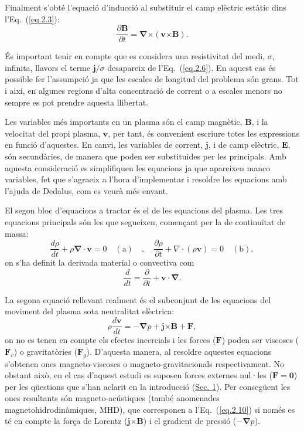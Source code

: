 Finalment s'obté l'equació d'inducció al substituir el camp elèctric estàtic %
dins l'Eq.~(\ref{eq.2.3}):
\begin{equation}
	\frac{\partial \bm{B}}{\partial t} = \bm{\nabla} \bm{\times} (\bm{v} \bm{\times} \bm{B}). \tag{2.7} \label{eq.2.7}
\end{equation}

És important tenir en compte que es considera una resistivitat del medi, $\sigma$, infinita, llavors el terme $\bm{j}/\sigma$ desapareix de l'Eq.~(\ref{eq.2.6}).
En aquest cas és possible fer l'assumpció ja que les escales de longitud del problema són grans. Tot i així, en algunes regions d'alta concentració de corrent o a escales menors no sempre es pot prendre aquesta llibertat.

Les variables més importants en un plasma són el camp magnètic, $\bm{B}$, i la velocitat del propi plasma, $\bm{v}$, per tant, és convenient escriure totes les expressions en funció d'aquestes.
En canvi, les variables de corrent, $\bm{j}$, i de camp elèctric, $\bm{E}$, són secundàries, de manera que poden ser substituides per les principals.
Amb aquesta consideració es simplifiquen les equacions ja que apareixen manco variables, fet que s'agraeix a l'hora d'implementar i resoldre les equacions amb l'ajuda de Dedalus, com es veurà més envant.



El segon bloc d'equacions a tractar és el de les equacions del plasma. Les tres equacions principals són les que segueixen, començant per la de continuïtat de massa:
\begin{equation}
	\frac{d\rho}{dt} + \rho \bm{\nabla} \cdot \bm{v} = 0 \quad (\text{a}) \quad , \quad \frac{\partial \rho}{\partial t} + \nabla \cdot (\rho \bm{v}) = 0 \quad (\text{b}), \tag{2.8} \label{eq.2.8}
\end{equation}
on s'ha definit la derivada material o convectiva com
\begin{equation}
	\frac{d}{dt} = \frac{\partial}{\partial t} + \bm{v} \cdot \bm{\nabla}. \tag{2.9} \label{eq.2.9}
\end{equation}

La segona equació rellevant realment és el subconjunt de les equacions del moviment del plasma sota neutralitat elèctrica:
\begin{equation}
	\rho \frac{d \bm{v}}{dt} = - \bm{\nabla} p + \bm{j} \bm{\times} \bm{B} + \bm{F}, \tag{2.10} \label{eq.2.10}
\end{equation}
on no es tenen en compte els efectes incercials i les forces ($\bm{F}$) poden ser viscoses ($\bm{F}_{v}$) o gravitatòries ($\bm{F}_g$).
D'aquesta manera, al resoldre aquestes equacions s'obtenen ones magneto-viscoses o magneto-gravitacionals respectivament.
No obstant això, en el cas d'aquest estudi es suposen forces externes nul·les ($\bm{F} = \bm{0}$) per les qüestions que s'han aclarit en la introducció (\hyperref[sec:intro]{Sec. 1}). %
Per consegüent les ones resultants són magneto-acústiques (també anomenades magnetohidrodinàmiques, MHD), que corresponen a l'Eq.~(\ref{eq.2.10}) si només es té en compte la força de Lorentz ($\bm{j} \bm{\times} \bm{B}$) i el gradient de pressió ($- \bm{\nabla} p$).

